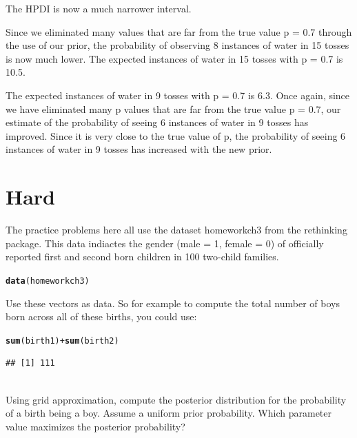 \documentclass[12pt]{article}\usepackage[]{graphicx}\usepackage[]{color}
\makeatletter
\newcommand{\hlopt}[1]{\textcolor[rgb]{0,0,0}{#1}}%
\newcommand{\hlstd}[1]{\textcolor[rgb]{0.345,0.345,0.345}{#1}}%
\newcommand{\hlkwd}[1]{\textcolor[rgb]{0.737,0.353,0.396}{\textbf{#1}}}%
\newenvironment{kframe}{%
 \def\at@end@of@kframe{}%
 \ifinner\ifhmode%
  \def\at@end@of@kframe{\end{minipage}}%
  \begin{minipage}{\columnwidth}%
 \fi\fi%
 \def\FrameCommand##1{\hskip\@totalleftmargin \hskip-\fboxsep
 \colorbox{shadecolor}{##1}\hskip-\fboxsep
     \hskip-\linewidth \hskip-\@totalleftmargin \hskip\columnwidth}%
 \MakeFramed {\advance\hsize-\width
   \@totalleftmargin\z@ \linewidth\hsize
   \@setminipage}}%
 {\par\unskip\endMakeFramed%
 \at@end@of@kframe}
\newenvironment{knitrout}{}{} %
\newenvironment{problem}[2][Problem]{\begin{trivlist}
\item[\hskip \labelsep {\bfseries #1}\hskip \labelsep {\bfseries #2.}]}{\end{trivlist}}
\makeatother
\begin{document}
The HPDI is now a much narrower interval.

Since we eliminated many values that are far from the true value p = 0.7 through the use of our prior, the probability of observing 8 instances of water in 15 tosses is now much lower. The expected instances of water in 15 tosses with p = 0.7 is 10.5.

The expected instances of water in 9 tosses with p = 0.7 is 6.3. Once again, since we have eliminated many p values that are far from the true value p = 0.7, our estimate of the probability of seeing 6 instances of water in 9 tosses has improved. Since it is very close to the true value of p, the probability of seeing 6 instances of water in 9 tosses has increased with the new prior.

\section{Hard}

The practice problems here all use the dataset homeworkch3 from the rethinking package. This data indiactes the gender (male = 1, female = 0) of officially reported first and second born children in 100 two-child families.

\begin{knitrout}
\color{fgcolor}\begin{kframe}
\begin{alltt}
\hlkwd{data}\hlstd{(homeworkch3)}
\end{alltt}
\end{kframe}
\end{knitrout}

Use these vectors as data. So for example to compute the total number of boys born across all of these births, you could use:

\begin{knitrout}
\color{fgcolor}\begin{kframe}
\begin{alltt}
\hlkwd{sum}\hlstd{(birth1)} \hlopt{+} \hlkwd{sum}\hlstd{(birth2)}
\end{alltt}
\begin{verbatim}
## [1] 111
\end{verbatim}
\end{kframe}
\end{knitrout}

\begin{problem}{3H1}
\text{}\\
Using grid approximation, compute the posterior distribution for the probability of a birth being a boy. Assume a uniform prior probability. Which parameter value maximizes the posterior probability?
\end{problem}
\end{document}
